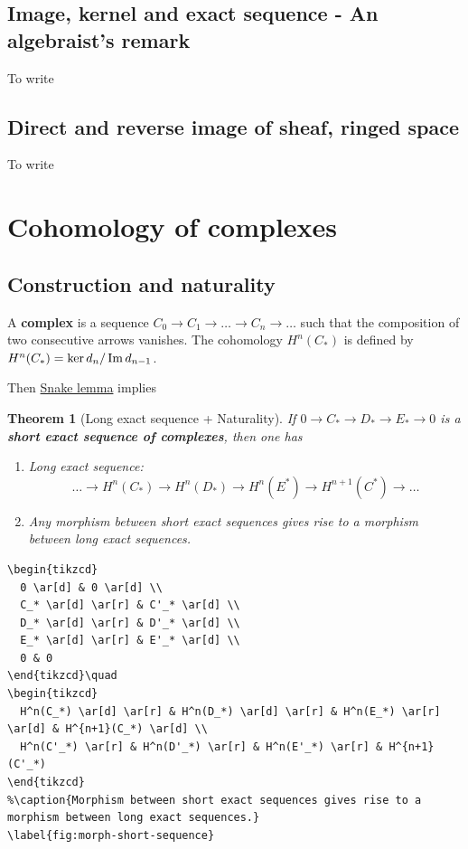 \documentclass[11pt]{article}
\newtheorem{theorem}{Theorem}
\newcommand{\im}{\mathop{\rm Im}\nolimits}
\begin{document}
\subsection{Image, kernel and exact sequence - An algebraist's remark}
\label{sec:org32c7c12}
To write

\subsection{Direct and reverse image of sheaf, ringed space}
\label{sec:org8c61468}
To write


\section{Cohomology of complexes}
\label{sec:orgbad4845}

\subsection{Construction and naturality}
\label{sec:orgdb74180}
  A \textbf{complex} is a sequence \(C_0 \longrightarrow C_1 \longrightarrow \dots \longrightarrow C_n
\longrightarrow \dots\) such that the composition of two consecutive arrows vanishes. The
cohomology \(H^n(C_*)\) is defined by \(H^n(C_*) = \ker d_{n}/ \im d_{n-1}\).

Then \href{https://en.wikipedia.org/wiki/Snake\_lemma}{Snake lemma} implies

\begin{theorem}[Long exact sequence + Naturality]
\label{thm:cohomology-complex}
If \(0 \longrightarrow  C_* \longrightarrow D_* \longrightarrow E_* \longrightarrow 0\)
is a \textbf{short exact sequence of complexes}, then one has
\begin{enumerate}
\item Long exact sequence:
\[\dots \longrightarrow  H^n(C_*) \longrightarrow  H^n(D_*) \longrightarrow H^n(E^*) \longrightarrow
   H^{n+1}(C^*) \longrightarrow \dots \]
\item Any morphism between short exact sequences gives rise to a morphism between long exact sequences.
\end{enumerate}
\end{theorem}

\begin{verbatim}
\begin{tikzcd}
  0 \ar[d] & 0 \ar[d] \\
  C_* \ar[d] \ar[r] & C'_* \ar[d] \\
  D_* \ar[d] \ar[r] & D'_* \ar[d] \\
  E_* \ar[d] \ar[r] & E'_* \ar[d] \\
  0 & 0 
\end{tikzcd}\quad 
\begin{tikzcd} 
  H^n(C_*) \ar[d] \ar[r] & H^n(D_*) \ar[d] \ar[r] & H^n(E_*) \ar[r] \ar[d] & H^{n+1}(C_*) \ar[d] \\
  H^n(C'_*) \ar[r] & H^n(D'_*) \ar[r] & H^n(E'_*) \ar[r] & H^{n+1}(C'_*) 
\end{tikzcd}
%\caption{Morphism between short exact sequences gives rise to a morphism between long exact sequences.}
\label{fig:morph-short-sequence}
\end{verbatim}
\end{document}
